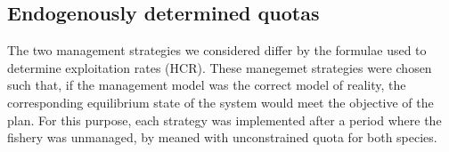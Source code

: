 \documentclass[12pt,oneline,a4paper,numbib]{ouparticle}
\numberwithin{equation}{subsection} %
\begin{document}
\begin{table}[!h]
\centering
\caption{Linear mass-prices estimated based on mean prices per mass age-classes. The price slopes $\beta_0$ were assumed to be similar to mean prices.}
\label{t:pricing}
\end{table}

\subsection{Endogenously determined quotas}
\label{sec2.3}

The two management strategies we considered differ by the formulae used to determine exploitation rates (HCR). These manegemet strategies were chosen such that, if  the  management  model  was  the  correct  model  of  reality,  the corresponding  equilibrium  state  of  the  system  would  meet  the  objective  of  the  plan. For this purpose, each strategy was implemented after a period where the fishery was unmanaged, by meaned with unconstrained quota for both species.
\end{document}
